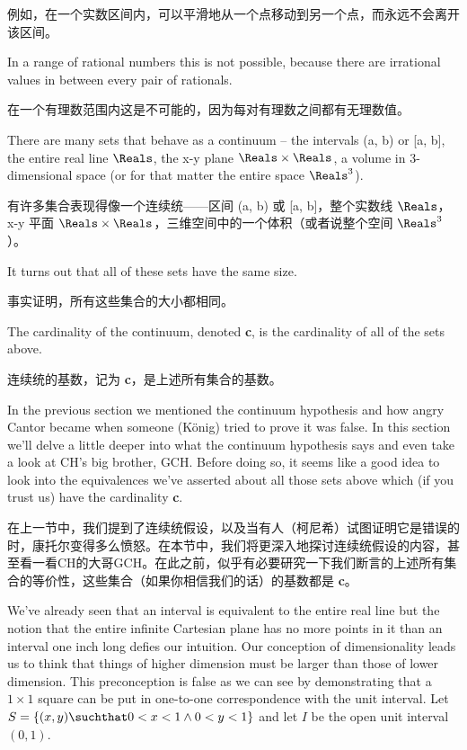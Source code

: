 例如，在一个实数区间内，可以平滑地从一个点移动到另一个点，而永远不会离开该区间。

In a range of rational numbers this is not possible,
because there are irrational values in between every pair of rationals.

在一个有理数范围内这是不可能的，因为每对有理数之间都有无理数值。

There
are many sets that behave as a continuum -- the intervals (a, b) or [a, b], the
entire real line $\Reals$, the x-y plane $\Reals \times \Reals$, a volume in 3-dimensional space (or
for that matter the entire space $\Reals^3$).

有许多集合表现得像一个连续统——区间 (a, b) 或 [a, b]，整个实数线 $\Reals$，x-y 平面 $\Reals \times \Reals$，三维空间中的一个体积（或者说整个空间 $\Reals^3$）。

It turns out that all of these sets have
the same size.

事实证明，所有这些集合的大小都相同。

The cardinality of the continuum, denoted {\bf c}, is the cardinality of all of the
sets above.

连续统的基数，记为 {\bf c}，是上述所有集合的基数。

In the previous section we mentioned the continuum hypothesis and how
angry Cantor became when someone (K\"{o}nig) tried to prove it
was false.   In this section we'll delve a little deeper into what the
continuum hypothesis says and even take a look at CH's big brother, GCH.
Before doing so, it seems like a good idea to look into the equivalences
we've asserted about all those sets above which (if you trust us) have the
cardinality {\bf c}.

在上一节中，我们提到了连续统假设，以及当有人（柯尼希）试图证明它是错误的时，康托尔变得多么愤怒。在本节中，我们将更深入地探讨连续统假设的内容，甚至看一看CH的大哥GCH。在此之前，似乎有必要研究一下我们断言的上述所有集合的等价性，这些集合（如果你相信我们的话）的基数都是 {\bf c}。

We've already seen that an interval is equivalent to the entire
real line but the notion that the entire infinite Cartesian plane has no more
points in it than
an interval one inch long defies our intuition.  Our conception
of dimensionality leads us to think that things of higher dimension must be
larger than those of lower dimension.  This preconception is false as we can see
by demonstrating that a $1 \times 1$  square can be put in one-to-one correspondence
with the unit interval.
Let $S = \{ (x, y) \suchthat 0 < x < 1 \land  0 < y < 1 \}$ and let $I$ be
the open unit interval $(0, 1)$.

